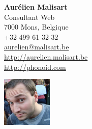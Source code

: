 \noindent\begin{minipage}[c]{.7\linewidth}
  \begin{flushleft}
    \noindent\textbf{\Large Aurélien Malisart}\\
    Consultant Web\\
    7000 Mons, Belgique\\
    +32 499 61 32 32\\
    \href{mailto:aurelien@malisart.com}{aurelien@malisart.be}\\
    \vspace{0.5cm}
    \url{http://aurelien.malisart.be}\\
    \url{http://phonoid.com}
  \end{flushleft}
\end{minipage}
\begin{minipage}[c]{.3\linewidth}
  \begin{flushright}
    \noindent
    \includegraphics[height=90px]{photo}
  \end{flushright}
\end{minipage}
